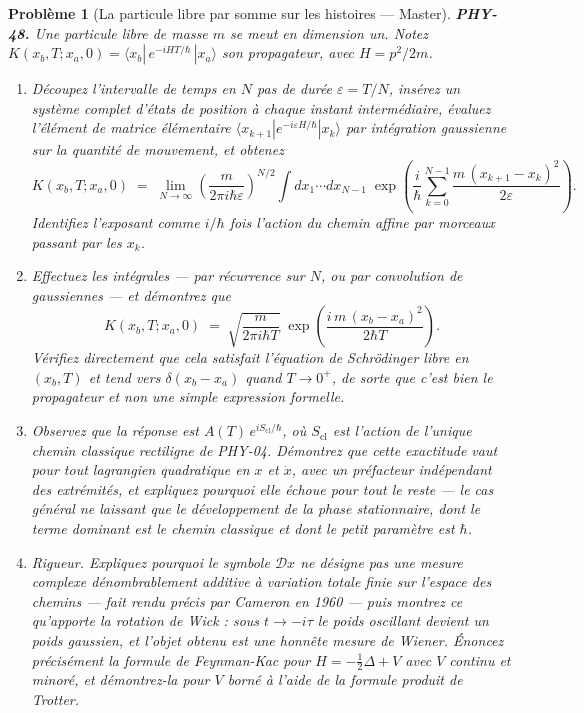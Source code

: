 \documentclass[11pt]{article}
\newtheorem{problem}{Problème}
\begin{document}
\begin{problem}[{La particule libre par somme sur les histoires --- Master}]
\textbf{PHY-48.} Une particule libre de masse $m$ se meut en dimension un. Notez
$K(x_b,T;x_a,0) = \langle x_b|\,e^{-iHT/\hbar}\,|x_a\rangle$ son propagateur, avec
$H = p^{2}/2m$.
\begin{enumerate}
\item[(a)] Découpez l'intervalle de temps en $N$ pas de durée $\varepsilon = T/N$, insérez un système
complet d'états de position à chaque instant intermédiaire, évaluez l'élément de matrice
élémentaire $\langle x_{k+1}|e^{-i\varepsilon H/\hbar}|x_k\rangle$ par intégration gaussienne
sur la quantité de mouvement, et obtenez
\[ K(x_b,T;x_a,0) \;=\; \lim_{N\to\infty} \left(\frac{m}{2\pi i\hbar\varepsilon}\right)^{\!N/2}
\int dx_1\cdots dx_{N-1}\;
\exp\!\left(\frac{i}{\hbar}\sum_{k=0}^{N-1}\frac{m\,(x_{k+1}-x_k)^{2}}{2\varepsilon}\right). \]
Identifiez l'exposant comme $i/\hbar$ fois l'action du chemin affine par morceaux passant par
les $x_k$.
\item[(b)] Effectuez les intégrales --- par récurrence sur $N$, ou par convolution de gaussiennes --- et
démontrez que
\[ K(x_b,T;x_a,0) \;=\; \sqrt{\frac{m}{2\pi i\hbar T}}\;
\exp\!\left(\frac{i\,m\,(x_b-x_a)^{2}}{2\hbar T}\right). \]
Vérifiez directement que cela satisfait l'équation de Schrödinger libre en $(x_b,T)$ et tend
vers $\delta(x_b - x_a)$ quand $T \to 0^{+}$, de sorte que c'est bien le propagateur et non
une simple expression formelle.
\item[(c)] Observez que la réponse est $A(T)\,e^{iS_{\mathrm{cl}}/\hbar}$, où $S_{\mathrm{cl}}$ est
l'action de l'unique chemin classique rectiligne de PHY-04. Démontrez que cette exactitude vaut
pour tout lagrangien quadratique en $x$ et $\dot{x}$, avec un préfacteur indépendant des
extrémités, et expliquez pourquoi elle échoue pour tout le reste --- le cas général ne laissant que
le développement de la phase stationnaire, dont le terme dominant est le chemin classique et dont
le petit paramètre est $\hbar$.
\item[(d)] Rigueur. Expliquez pourquoi le symbole $\mathcal{D}x$ ne désigne pas une mesure complexe
dénombrablement additive à variation totale finie sur l'espace des chemins --- fait rendu précis par
Cameron en 1960 --- puis montrez ce qu'apporte la rotation de Wick : sous $t \to -i\tau$ le poids
oscillant devient un poids gaussien, et l'objet obtenu est une honnête mesure de Wiener. Énoncez
précisément la formule de Feynman-Kac pour $H = -\tfrac{1}{2}\Delta + V$ avec $V$ continu et
minoré, et démontrez-la pour $V$ borné à l'aide de la formule produit de Trotter.
\end{enumerate}

\end{problem}
\end{document}
